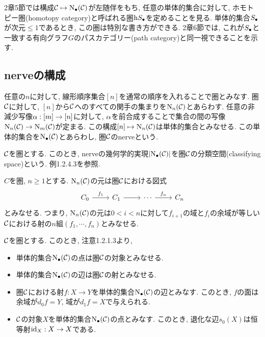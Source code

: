 \documentclass[uplatex, a4paper, 14Q, dvipdfmx]{jsreport}
\begin{document}
2章5節では構成$\calC \mt \N(\calC)$が左随伴をもち, 任意の単体的集合に対して, ホモトピー圏(homotopy category)と呼ばれる圏$\h \S$を定めることを見る. 
単体的集合$\S$が次元$\leq 1$であるとき, この圏は特別な書き方ができる. 
2章6節では, これが$\S$と一致する有向グラフ$G$のパスカテゴリー(path category)と同一視できることを示す. 

\subsection{nerveの構成}

\begin{cons}
  任意の$n$に対して, 線形順序集合$[n]$を通常の順序を入れることで圏とみなす. 
  圏$\calC$に対して, $[n]$から$\calC$へのすべての関手の集まりを$\mathrm{N}_n(\calC)$とあらわす. 
  任意の非減少写像$\al: [m] \to [n]$に対して, $\al$を前合成することで集合の間の写像$\mathrm{N}_n(\calC) \to \mathrm{N}_m(\calC)$が定まる. 
  この構成$[n] \mt \mathrm{N}_n(\calC)$は単体的集合とみなせる. 
  この単体的集合を$\N(\calC)$とあらわし, 圏$\calC$のnerveという. 
\end{cons}

\begin{remark}
  $\calC$を圏とする. 
  このとき, nerveの幾何学的実現$|\N(\calC)|$を圏$\calC$の分類空間(classifying space)という. 
  例1.2.4.3を参照. 
\end{remark}

\begin{remark}
  $C$を圏, $n \geq 1$とする. 
  $\mathrm{N}_n(\calC)$の元は圏$\calC$における図式
  \[\begin{tikzcd}
    {C_0} & {C_1} & \cdots & {C_n}
    \arrow[from=1-2, to=1-3]
    \arrow["{f_n}", from=1-3, to=1-4]
    \arrow["{f_1}", from=1-1, to=1-2]
  \end{tikzcd}\]
  とみなせる. 
  つまり, $\mathrm{N}_n(\calC)$の元は$0<i<n$に対して$f_{i+1}$の域と$f_i$の余域が等しい$\calC$における射の$n$組$(f_1,\cdots,f_n)$とみなせる. 
\end{remark}

\begin{example}
  $\calC$を圏とする. 
  このとき, 注意1.2.1.3より, 
  \begin{itemize}
    \item 単体的集合$\N(\calC)$の点は圏$\calC$の対象とみなせる. 
    \item 単体的集合$\N(\calC)$の辺は圏$\calC$の射とみなせる. 
    \item 圏$\calC$における射$f: X \to Y$を単体的集合$\N(\calC)$の辺とみなす. 
    このとき, $f$の面は余域が$d_0f=Y$, 域が$d_1f=X$で与えられる.
    \item $\calC$の対象$X$を単体的集合$\N(\calC)$の点とみなす. 
    このとき, 退化な辺$s_0(X)$は恒等射$\id_X: X \to X$である. 
  \end{itemize}
\end{example}
\end{document}
